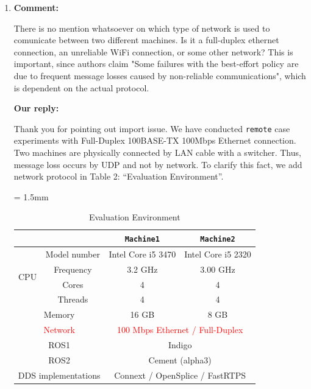 \documentclass{article}
\begin{document}
\begin{enumerate}
\item \begin{flushleft}
  \textbf{Comment:}
\end{flushleft}
  There is no mention whatsoever on which type of network is used to comunicate between two different machines. Is it a full-duplex ethernet connection, an unreliable WiFi connection, or some other network?
  This is important, since authors claim "Some failures with the best-effort policy are due to frequent message losses caused by non-reliable communications", which is dependent on the actual protocol.

  \begin{flushleft}
    \textbf{Our reply:}
  \end{flushleft}
  Thank you for pointing out import issue. 
  We have conducted \texttt{remote} case experiments with Full-Duplex 100BASE-TX 100Mbps Ethernet connection.
  Two machines are physically connected by LAN cable with a switcher.
  Thus, message loss occurs by UDP and not by network.
  To clarify this fact, we add network protocol in Table 2: ``Evaluation Environment''.
  \setcounter{table}{1}
  \begin{table}[h]
    \caption{Evaluation Environment}
    \centering
    \begin{threeparttable}
      \renewcommand{\arraystretch}{1.0}
      \label{tb:environment}
      \small
      \tabcolsep = 1.5mm              %
      \begin{tabular}{c|c||c|c}
        \hline
        \multicolumn{2}{c||}{ } & \textbf{\texttt{Machine1}} & \textbf{\texttt{Machine2}} \\ \hline \hline
        \multirow{4}{*}{CPU}   & Model number & Intel Core i5 3470 & Intel Core i5 2320 \\ 
        & Frequency & 3.2 GHz & 3.00 GHz \\ 
        & Cores & 4 & 4 \\ 
        & Threads & 4 & 4 \\ \hline
        \multicolumn{2}{c||}{Memory} & 16 GB & 8 GB \\ \hline 
        \multicolumn{2}{c||}{\textcolor{red}{Network}} & \multicolumn{2}{c}{\textcolor{red}{100 Mbps Ethernet / Full-Duplex}} \\ \hline
        \multicolumn{2}{c||}{ROS1} & \multicolumn{2}{c}{Indigo} \\ 
        \multicolumn{2}{c||}{ROS2} & \multicolumn{2}{c}{Cement (alpha3)} \\ 
        \multicolumn{2}{c||}{DDS implementations} & \multicolumn{2}{c}{Connext\tnote{1} / OpenSplice\tnote{2} / FastRTPS } \\ \hline 

\end{tabular}
\end{threeparttable}
\end{table}
\end{enumerate}
\end{document}
